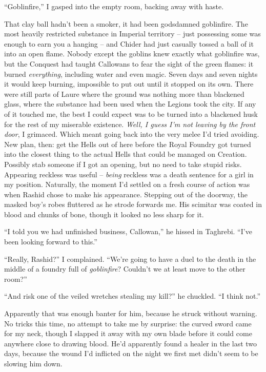 \documentclass[12pt, openany]{book}
\begin{document}
“Goblinfire,” I gasped into the empty room, backing away with haste.

That clay ball hadn’t been a smoker, it had been godsdamned goblinfire. The most heavily restricted substance in Imperial territory – just possessing some was enough to earn you a hanging – and Chider had just casually tossed a ball of it into an open flame. Nobody except the goblins knew exactly what goblinfire was, but the Conquest had taught Callowans to fear the sight of the green flames: it burned \textit{everything}, including water and even magic. Seven days and seven nights it would keep burning, impossible to put out until it stopped on its own. There were still parts of Laure where the ground was nothing more than blackened glass, where the substance had been used when the Legions took the city. If any of it touched me, the best I could expect was to be turned into a blackened husk for the rest of my miserable existence. \textit{Well, I guess I’m not leaving by the front door}, I grimaced. Which meant going back into the very melee I’d tried avoiding. New plan, then: get the Hells out of here before the Royal Foundry got turned into the closest thing to the actual Hells that could be managed on Creation. Possibly stab someone if I got an opening, but no need to take stupid risks. Appearing reckless was useful – \textit{being} reckless was a death sentence for a girl in my position. Naturally, the moment I’d settled on a fresh course of action was when Rashid chose to make his appearance. Stepping out of the doorway, the masked boy’s robes fluttered as he strode forwards me. His scimitar was coated in blood and chunks of bone, though it looked no less sharp for it.

“I told you we had unfinished business, Callowan,” he hissed in Taghrebi. “I’ve been looking forward to this.”

“Really, Rashid?” I complained. “We’re going to have a duel to the death in the middle of a foundry full of \textit{goblinfire}? Couldn’t we at least move to the other room?”

“And risk one of the veiled wretches stealing my kill?” he chuckled. “I think not.”

Apparently that was enough banter for him, because he struck without warning. No tricks this time, no attempt to take me by surprise: the curved sword came for my neck, though I slapped it away with my own blade before it could come anywhere close to drawing blood. He’d apparently found a healer in the last two days, because the wound I’d inflicted on the night we first met didn’t seem to be slowing him down.
\end{document}
